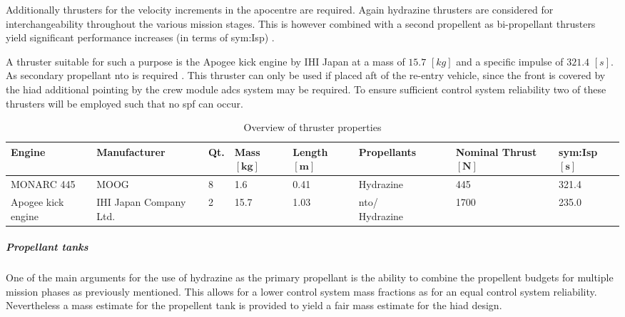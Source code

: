 Additionally thrusters for the velocity increments in the apocentre are required. Again hydrazine thrusters are considered for interchangeability throughout the various mission stages. This is however combined with a second propellent as bi-propellant thrusters yield significant performance increases (in terms of \gls{sym:Isp}) \cite{Wertz2011}. 

A thruster suitable for such a purpose is the Apogee kick engine by IHI Japan at a mass of $15.7$ $[kg]$ and a specific impulse of $321.4$ $[s]$. As secondary propellant \gls{nto} is required \cite[p.538]{Wertz2011}. This thruster can only be used if placed aft of the re-entry vehicle, since the front is covered by the \gls{hiad} additional pointing by the crew module \gls{adcs} system may be required. To ensure sufficient control system reliability two of these thrusters will be employed such that no \gls{spf} can occur. 

\begin{table}[h]
	\centering
\caption[Overview of thruster properties]{Overview of thruster properties \cite[p.538]{Wertz2011}}
\label{tab:thrusters}
\hspace{-5mm}
\begin{tabular}{|p{}|p{}|p{}|p{}|p{}|p{}|p{}|l|} \hline 
\textbf{Engine    }          &\textbf{ Manufacturer }         & \textbf{Qt.} &\textbf{Mass $\mathbf{[kg]}$}      & \textbf{Length $\mathbf{[m]}$} & \textbf{Propellants}  & \textbf{Nominal Thrust $\mathbf{[N]}$} & \textbf{\gls{sym:Isp} $\mathbf{[s]}$} \\ \hline \hline
MONARC 445          & MOOG                  & 8        & 1.6  & 0.41 & Hydrazine     & 445         & 321.4   \\ \hline
Apogee kick engine & IHI Japan Company Ltd. & 2        & 15.7 & 1.03 & \gls{nto}/ ~~~~~ Hydrazine & 1700        & 235.0     \\ \hline
\end{tabular}
\end{table}


\subparagraph{Propellant tanks}
One of the main arguments for the use of hydrazine as the primary propellant is the ability to combine the propellent budgets for multiple mission phases as previously mentioned. This allows for a lower control system mass fractions as for an equal control system reliability. Nevertheless a mass estimate for the propellent tank is provided to yield a fair mass estimate for the \gls{hiad} design. 

